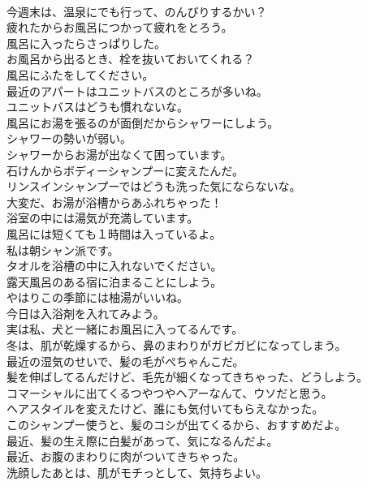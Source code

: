 \documentclass[8pt]{extreport}
\begin{document}
\begin{CJK}{UTF8}{min}
\\	今週末は、温泉にでも行って、のんびりするかい？	
\\	疲れたからお風呂につかって疲れをとろう。	
\\	風呂に入ったらさっぱりした。	
\\	お風呂から出るとき、栓を抜いておいてくれる？	
\\	風呂にふたをしてください。	
\\	最近のアパートはユニットバスのところが多いね。	
\\	ユニットバスはどうも慣れないな。	
\\	風呂にお湯を張るのが面倒だからシャワーにしよう。	
\\	シャワーの勢いが弱い。	
\\	シャワーからお湯が出なくて困っています。	
\\	石けんからボディーシャンプーに変えたんだ。	
\\	リンスインシャンプーではどうも洗った気にならないな。	
\\	大変だ、お湯が浴槽からあふれちゃった！	
\\	浴室の中には湯気が充満しています。	
\\	風呂には短くても１時間は入っているよ。	
\\	私は朝シャン派です。	
\\	タオルを浴槽の中に入れないでください。	
\\	露天風呂のある宿に泊まることにしよう。	
\\	やはりこの季節には柚湯がいいね。	
\\	今日は入浴剤を入れてみよう。	
\\	実は私、犬と一緒にお風呂に入ってるんです。	
\\	冬は、肌が乾燥するから、鼻のまわりがガビガビになってしまう。	
\\	最近の湿気のせいで、髪の毛がぺちゃんこだ。	
\\	髪を伸ばしてるんだけど、毛先が細くなってきちゃった、どうしよう。	
\\	コマーシャルに出てくるつやつやヘアーなんて、ウソだと思う。	
\\	ヘアスタイルを変えたけど、誰にも気付いてもらえなかった。	
\\	このシャンプー使うと、髪のコシが出てくるから、おすすめだよ。	
\\	最近、髪の生え際に白髪があって、気になるんだよ。	
\\	最近、お腹のまわりに肉がついてきちゃった。	
\\	洗顔したあとは、肌がモチっとして、気持ちよい。	

\end{CJK}
\end{document}
